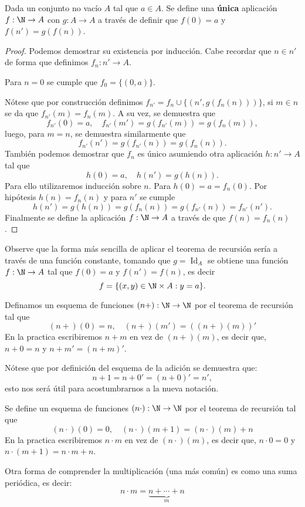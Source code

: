 \documentclass[11pt,oneside,a4paper]{book}
\DeclareMathOperator{\Id}{Id}
\begin{document}
\begin{thm}
Dada un conjunto no vacío $A$ tal que $a\in A$. Se define una \textbf{única} aplicación $f:\N\rightarrow A$ con $g:A\rightarrow A$ a través de definir que $f(0)=a$ y $f(n')=g(f(n))$.
\end{thm}
\begin{proof}
Podemos demostrar su existencia por inducción. Cabe recordar que $n\in n'$ de forma que definimos $f_n:n'\rightarrow A$.

Para $n=0$ se cumple que $f_0=\{(0,a)\}$.

Nótese que por construcción definimos $f_{n'}=f_n\cup\{(n',g(f_n(n)))\}$, si $m\in n$ se da que $f_{n'}(m)=f_n(m)$. A su vez, se demuestra que
$$f_{n'}(0)=a,\quad f_{n'}(m')=g(f_{n'}(m))=g(f_n(m)),$$
luego, para $m=n$, se demuestra similarmente que
$$f_{n'}(n')=g(f_{n'}(n))=g(f_n(n)).$$
También podemos demostrar que $f_n$ es único asumiendo otra aplicación $h:n'\rightarrow A$ tal que
$$h(0)=a,\quad h(n')=g(h(n)).$$
Para ello utilizaremos inducción sobre $n$. Para $h(0)=a=f_n(0)$. Por hipótesis $h(n)=f_n(n)$ y para $n'$ se cumple
$$h(n')=g(h(n))=g(f_n(n))=g(f_{n'}(n))=f_{n'}(n').$$
Finalmente se define la aplicación $f:\N\rightarrow A$ a través de que $f(n)=f_n(n)$.
\end{proof}

Observe que la forma más sencilla de aplicar el teorema de recursión sería a través de una función constante, tomando que $g=\Id_A$ se obtiene una función $f:\N\rightarrow A$ tal que $f(0)=a$ y $f(n')=f(n)$, es decir
$$f=\{(x,y)\in\N\times A:y=a\}.$$

\begin{mydef}[Adición]
Definamos un esquema de funciones $(n+):\N\rightarrow\N$ por el teorema de recursión tal que
$$
(n+)(0)=n,\quad (n+)(m')=((n+)(m))'
$$
En la practica escribiremos $n+m$ en vez de $(n+)(m)$, es decir que, $n+0=n$ y $n+m'=(n+m)'$.
\end{mydef}

Nótese que por definición del esquema de la adición se demuestra que:
$$n+1=n+0'=(n+0)'=n',$$
esto nos será útil para acostumbrarnos a la nueva notación.

\begin{mydef}[Multiplicación]
Se define un esquema de funciones $(n\cdot):\N\rightarrow\N$ por el teorema de recursión tal que
$$
(n\cdot)(0)=0,\quad (n\cdot)(m+1)=(n\cdot)(m)+n
$$
En la practica escribiremos $n\cdot m$ en vez de $(n\cdot)(m)$, es decir que, $n\cdot 0=0$ y $n\cdot(m+1)=n\cdot m+n$.
\end{mydef}
Otra forma de comprender la multiplicación (una más común) es como una suma periódica, es decir:
$$n\cdot m=\underbrace{n+\cdots+n}_m$$
\end{document}
